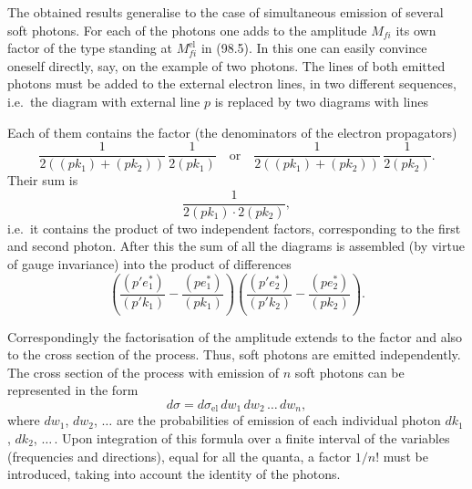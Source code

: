 The obtained results generalise to the case of simultaneous emission of several soft photons. For each of the photons one adds to the amplitude $M_{fi}$ its own factor of the type standing at $M_{fi}^\text{el}$ in (98.5). In this one can easily convince oneself directly, say, on the example of two photons. The lines of both emitted photons must be added to the external electron lines, in two different sequences, i.e.\ the diagram with external line $p$ is replaced by two diagrams with lines



Each of them contains the factor (the denominators of the electron propagators)
\[
\frac{1}{2((pk_1) + (pk_2))}\,\frac{1}{2(pk_1)} \quad \text{or} \quad \frac{1}{2((pk_1) + (pk_2))}\,\frac{1}{2(pk_2)}.
\]
Their sum is
\[
\frac{1}{2(pk_1)\cdot 2(pk_2)},
\]
i.e.\ it contains the product of two independent factors, corresponding to the first and second photon. After this the sum of all the diagrams is assembled (by virtue of gauge invariance) into the product of differences
\[
\left(\frac{(p'e_1^*)}{(p'k_1)} - \frac{(pe_1^*)}{(pk_1)}\right)\!\left(\frac{(p'e_2^*)}{(p'k_2)} - \frac{(pe_2^*)}{(pk_2)}\right).
\]

Correspondingly the factorisation of the amplitude extends to the factor and also to the cross section of the process. Thus, soft photons are emitted independently. The cross section of the process with emission of $n$ soft photons can be represented in the form
\begin{equation}
d\sigma = d\sigma_\text{el}\,dw_1\,dw_2\,\ldots\,dw_n,
\label{eq:98.14}
\end{equation}
where $dw_1$, $dw_2$, $\ldots$ are the probabilities of emission of each individual photon $dk_1$, $dk_2$, $\ldots$\,. Upon integration of this formula over a finite interval of the variables (frequencies and directions), equal for all the quanta, a factor $1/n!$ must be introduced, taking into account the identity of the photons.

